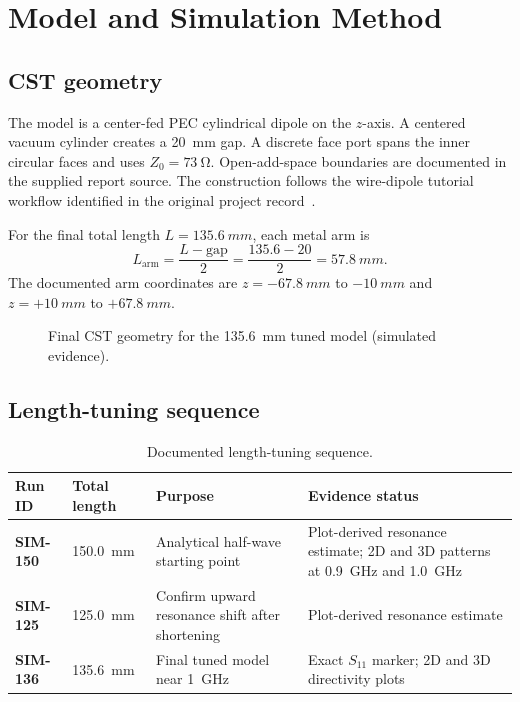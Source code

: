 \section{Model and Simulation Method}

\subsection{CST geometry}
The model is a center-fed PEC cylindrical dipole on the $z$-axis. A centered vacuum
cylinder creates a \SI{20}{mm} gap. A discrete face port spans the inner circular faces
and uses $Z_0=\SI{73}{\ohm}$. Open-add-space boundaries are documented in the
supplied report source. The construction follows the wire-dipole tutorial workflow
identified in the original project record~\cite{csttutorial}.

For the final total length $L=\SI{135.6}{mm}$, each metal arm is
\begin{equation}
L_{\mathrm{arm}}=\frac{L-\mathrm{gap}}{2}
=\frac{135.6-20}{2}=\SI{57.8}{mm}.
\end{equation}
The documented arm coordinates are $z=-\SI{67.8}{mm}$ to $-\SI{10}{mm}$ and
$z=+\SI{10}{mm}$ to $+\SI{67.8}{mm}$.

\begin{figure}[H]
\centering
{}
\caption{Final CST geometry for the \SI{135.6}{mm} tuned model (simulated evidence).}
\label{fig:final-geometry}
\end{figure}

\subsection{Length-tuning sequence}
\begin{table}[H]
\centering
\caption{Documented length-tuning sequence.}
\label{tab:tuning-runs}
\begin{tabularx}{\textwidth}{>{\bfseries}p{}p{}XX}
\toprule
Run ID & Total length & Purpose & Evidence status \\
\midrule
SIM-150 & \SI{150.0}{mm} & Analytical half-wave starting point & Plot-derived resonance estimate; 2D and 3D patterns at \SI{0.9}{GHz} and \SI{1.0}{GHz} \\
SIM-125 & \SI{125.0}{mm} & Confirm upward resonance shift after shortening & Plot-derived resonance estimate \\
SIM-136 & \SI{135.6}{mm} & Final tuned model near \SI{1}{GHz} & Exact $S_{11}$ marker; 2D and 3D directivity plots \\
\bottomrule
\end{tabularx}
\end{table}

